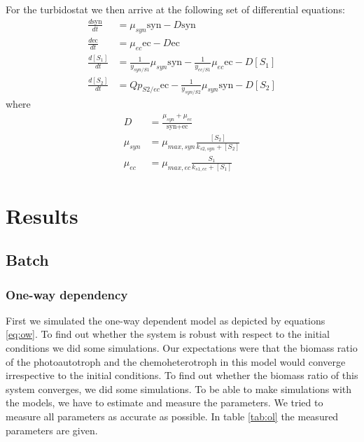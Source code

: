 \documentclass[12pt]{report}
\begin{document}
For the turbidostat we then arrive at the following set of differential equations:
\begin{align} \label{eq:turb}
 \frac{d\text{syn}}{dt} &= \mu_{syn}\text{syn} - D\text{syn}\\
 \frac{d\text{ec}}{dt} &= \mu_{ec}\text{ec} - D\text{ec} \\
 \frac{d[S_1]}{dt} &= \frac{1}{y_{syn/S1}} \mu_{syn} \text{syn} - \frac{1}{y_{ec/S1}} \mu_{ec} \text{ec} -D[S_1]\\
 \frac{d[S_2]}{dt} &=  Qp_{S2/ec}\text{ec} - \frac{1}{y_{syn/S2}} \mu_{syn} \text{syn} -D[S_2]
\end{align}
where
\begin{align}
 D &= \frac{\mu_{syn} + \mu_{ec}}{\text{syn}+\text{ec}}\\
 \mu_{syn} &= \mu_{max,syn} \frac{[S_2]}{k_{s2,syn}+[S_{2}]}\\
 \mu_{ec} &= \mu_{max,ec} \frac{S_1}{k_{s1,ec}+[S_1]} \label{eq:turbend}
\end{align}



\section{Results}
\subsection{Batch}
\subsubsection{One-way dependency}
First we simulated the one-way dependent model as depicted by equations \ref{eq:ow}. 
To find out whether the system is robust with respect to the initial conditions we did some simulations. Our expectations were that the biomass ratio of the photoautotroph and the chemoheterotroph in this model would converge irrespective to the initial conditions.
To find out whether the biomass ratio of this system converges, we did some simulations. To be able to make simulations with the models, we have to estimate and measure the parameters.
We tried to measure all parameters as accurate as possible. In table \ref{tab:ol} the measured parameters are given.
\end{document}
